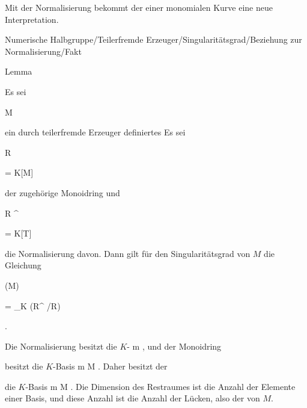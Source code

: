 Mit der Normalisierung bekommt der
einer monomialen Kurve eine neue Interpretation.



{Numerische Halbgruppe/Teilerfremde Erzeuger/Singularitätsgrad/Beziehung zur Normalisierung/Fakt}

{Lemma}

{}

{


Es sei


\mavergleichskette

{\vergleichskette

{M
}

{ \subseteq }{ \N
}

{  }{
}

{    }{
}

{   }{
}

}
{}{}{}
ein durch teilerfremde Erzeuger definiertes
Es sei


\mavergleichskette

{\vergleichskette

{R
}

{ = }{ K[M]
}

{  }{
}

{    }{
}

{   }{
}

}
{}{}{}
der zugehörige Monoidring und


\mavergleichskette

{\vergleichskette

{ R ^{ }
}

{ = }{ K[T]
}

{  }{
}

{    }{
}

{   }{
}

}
{}{}{}
die Normalisierung davon. Dann gilt für den Singularitätsgrad von $M$ die Gleichung


\mavergleichskettedisp

{\vergleichskette

{ \delta (M)
}

{ =} { \dim_K (R^{ }/R)
}

{ } {
}

{ } {
}

{ } {
}

}
{}{}{.}


}

{


Die Normalisierung besitzt die
$K$-
 { m \in \N  }{,} und der Monoidring

 besitzt die $K$-Basis  { m \in M   }{.} Daher besitzt der


 die $K$-Basis  { m \in \N \setminus M   }{.} Die Dimension des Restraumes ist die Anzahl der Elemente einer Basis, und diese Anzahl ist die Anzahl der Lücken, also der
von $M$.


}
